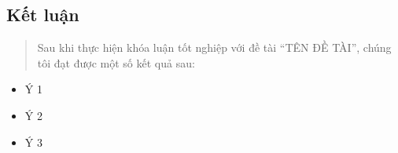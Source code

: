 \subsection{Kết luận}\label{kux1ebft-luux1eadn}

\begin{quote}
Sau khi thực hiện khóa luận tốt nghiệp với đề tài ``TÊN ĐỀ TÀI'', chúng tôi đạt được một số kết quả sau:
\end{quote}

\begin{itemize}
\item
  Ý 1
\item
  Ý 2
\item
  Ý 3
\end{itemize}
